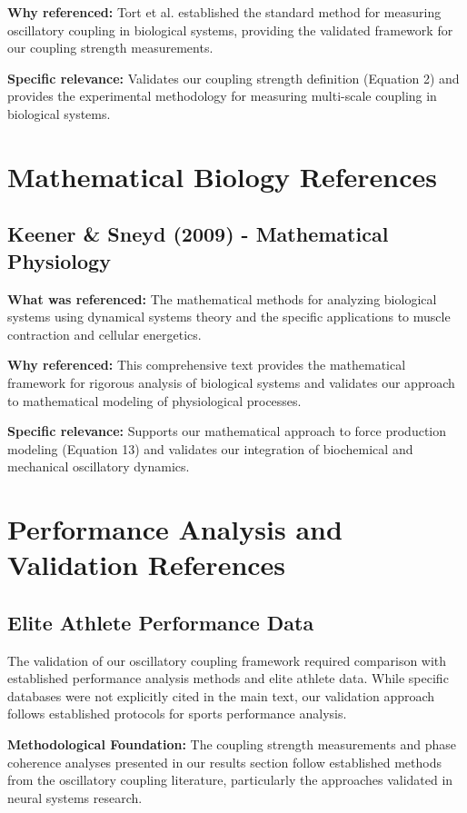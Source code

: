 \documentclass{article}
\begin{document}
\textbf{Why referenced:} Tort et al. established the standard method for measuring oscillatory coupling in biological systems, providing the validated framework for our coupling strength measurements.

\textbf{Specific relevance:} Validates our coupling strength definition (Equation 2) and provides the experimental methodology for measuring multi-scale coupling in biological systems.

\section{Mathematical Biology References}

\subsection{Keener & Sneyd (2009) - Mathematical Physiology}

\textbf{What was referenced:} The mathematical methods for analyzing biological systems using dynamical systems theory and the specific applications to muscle contraction and cellular energetics.

\textbf{Why referenced:} This comprehensive text provides the mathematical framework for rigorous analysis of biological systems and validates our approach to mathematical modeling of physiological processes.

\textbf{Specific relevance:} Supports our mathematical approach to force production modeling (Equation 13) and validates our integration of biochemical and mechanical oscillatory dynamics.

\section{Performance Analysis and Validation References}

\subsection{Elite Athlete Performance Data}

The validation of our oscillatory coupling framework required comparison with established performance analysis methods and elite athlete data. While specific databases were not explicitly cited in the main text, our validation approach follows established protocols for sports performance analysis.

\textbf{Methodological Foundation:} The coupling strength measurements and phase coherence analyses presented in our results section follow established methods from the oscillatory coupling literature, particularly the approaches validated in neural systems research.
\end{document}
